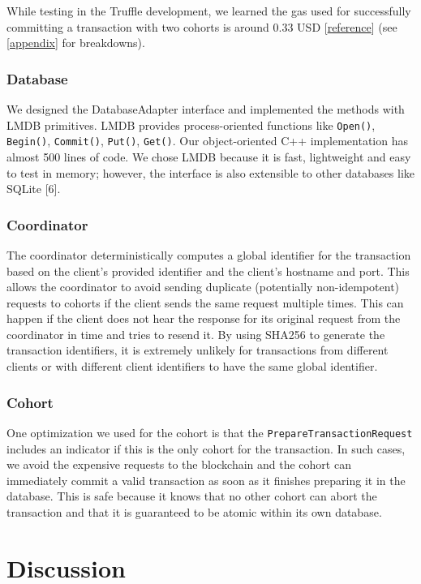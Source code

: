 \documentclass[11pt,conference]{IEEEtran}
\begin{document}
While testing in the Truffle development, we learned the gas used for successfully committing a transaction with two cohorts is around 0.33 USD [\href{https://automatedwebtools.com/gwei-to-usd-calculator/}{reference}] (see \ref{appendix} for breakdowns).

\subsubsection{Database}
We designed the DatabaseAdapter interface and implemented the methods with LMDB primitives. LMDB provides process-oriented functions like \texttt{Open()}, \texttt{Begin()}, \texttt{Commit()}, \texttt{Put()}, \texttt{Get()}. Our object-oriented C++ implementation has almost 500 lines of code. We chose LMDB because it is fast, lightweight and easy to test in memory; however, the interface is also extensible to other databases like SQLite [6].

\subsubsection{Coordinator}
The coordinator deterministically computes a global identifier for the transaction based on the client’s provided identifier and the client’s hostname and port. This allows the coordinator to avoid sending duplicate (potentially non-idempotent) requests to cohorts if the client sends the same request multiple times. This can happen if the client does not hear the response for its original request from the coordinator in time and tries to resend it. By using SHA256 to generate the transaction identifiers, it is extremely unlikely for transactions from different clients or with different client identifiers to have the same global identifier.

\subsubsection{Cohort}
One optimization we used for the cohort is that the \texttt{PrepareTransactionRequest} includes an indicator if this is the only cohort for the transaction. In such cases, we avoid the expensive requests to the blockchain and the cohort can immediately commit a valid transaction as soon as it finishes preparing it in the database. This is safe because it knows that no other cohort can abort the transaction and that it is guaranteed to be atomic within its own database.


\section{Discussion}
\end{document}
